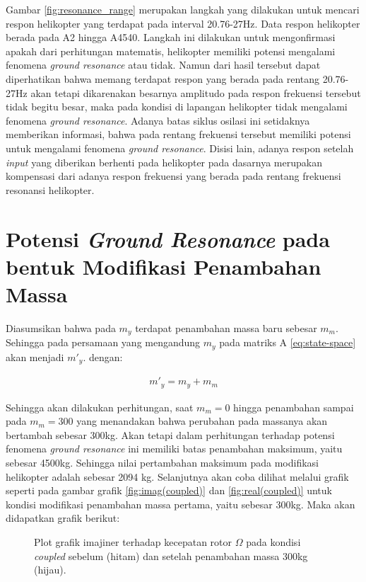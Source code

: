 Gambar \ref{fig:resonance_range} merupakan langkah yang dilakukan untuk mencari respon helikopter yang terdapat pada interval 20.76-27Hz. Data respon helikopter berada pada A2 hingga A4540. Langkah ini dilakukan untuk mengonfirmasi apakah dari perhitungan matematis, helikopter memiliki potensi mengalami fenomena \textit{ground resonance} atau tidak. Namun dari hasil tersebut dapat diperhatikan bahwa memang terdapat respon yang berada pada rentang 20.76-27Hz akan tetapi dikarenakan besarnya amplitudo pada respon frekuensi tersebut tidak begitu besar, maka pada kondisi di lapangan helikopter tidak mengalami fenomena \textit{ground resonance}. Adanya batas siklus osilasi ini setidaknya memberikan informasi, bahwa pada rentang frekuensi tersebut memiliki potensi untuk mengalami fenomena \textit{ground resonance}. Disisi lain, adanya respon setelah \textit{input} yang diberikan berhenti pada helikopter pada dasarnya merupakan kompensasi dari adanya respon frekuensi yang berada pada rentang frekuensi resonansi helikopter.

\section{Potensi \textit{Ground Resonance} pada bentuk Modifikasi Penambahan Massa}

Diasumsikan bahwa pada $m_y$ terdapat penambahan massa baru sebesar $m_m$. Sehingga pada persamaan yang mengandung $m_y$ pada matriks A \ref{eq:state-space} akan menjadi $m'_y$. dengan:

\begin{align}
	\label{eq:modified}
	m'_y=m_y+m_m
\end{align}

Sehingga akan dilakukan perhitungan, saat $m_m = 0$ hingga penambahan sampai pada $m_m = 300$ yang menandakan bahwa perubahan pada massanya akan bertambah sebesar 300kg. Akan tetapi dalam perhitungan terhadap potensi fenomena \textit{ground resonance} ini memiliki batas penambahan maksimum, yaitu sebesar 4500kg. Sehingga nilai pertambahan maksimum pada modifikasi helikopter adalah sebesar 2094 kg. Selanjutnya akan coba dilihat melalui grafik seperti pada gambar grafik \ref{fig:imag(coupled)} dan \ref{fig:real(coupled)} untuk kondisi modifikasi penambahan massa pertama, yaitu sebesar 300kg. Maka akan didapatkan grafik berikut:

\begin{figure}[H]
	\centering
	\caption{Plot grafik imajiner terhadap kecepatan rotor $\Omega$ pada kondisi \textit{coupled} sebelum (hitam) dan setelah penambahan massa 300kg (hijau).}
	\label{fig:imag(modified)_1}
\end{figure}

